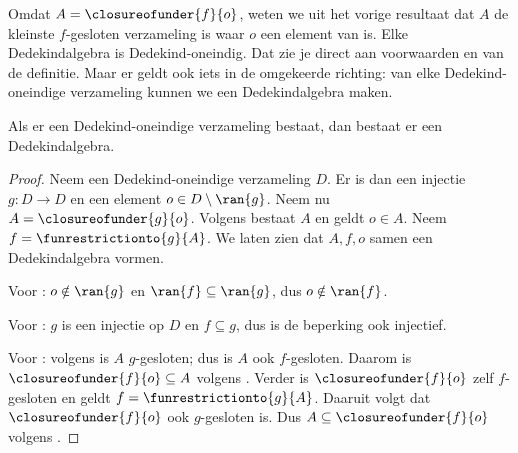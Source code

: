 \documentclass[../../../include/open-logic-section]{subfiles}
\begin{document}
Omdat $A = \closureofunder{f}{o}$, weten we uit het vorige resultaat
dat $A$ de kleinste $f$-gesloten verzameling is waar $o$ een element
van is. Elke Dedekindalgebra is Dedekind-oneindig. Dat zie je direct aan
voorwaarden  en  van de
definitie. Maar er geldt ook iets in de omgekeerde richting: van elke
Dedekind-oneindige verzameling kunnen we een Dedekindalgebra maken.

\begin{thm}
Als er een Dedekind-oneindige verzameling bestaat, dan bestaat er een
Dedekindalgebra.
\end{thm}

\begin{proof}
Neem een Dedekind-oneindige verzameling $D$. Er is dan een injectie $g
\colon D \to D$ en een element $o \in D \setminus \ran{g}$. Neem nu
$A = \closureofunder{g}{o}$. Volgens  bestaat
$A$ en geldt $o \in A$. Neem $f = \funrestrictionto{g}{A}$. We laten
zien dat $A, f, o$ samen een Dedekindalgebra vormen.

Voor : $o \notin \ran{g}$ en $\ran{f} \subseteq
\ran{g}$, dus $o\notin \ran{f}$.

Voor : $g$ is een injectie op $D$ en $f
\subseteq g$, dus is de beperking ook injectief.

Voor : volgens  is $A$
$g$-gesloten; dus is $A$ ook $f$-gesloten. Daarom is
$\closureofunder{f}{o} \subseteq A$ volgens
. Verder is $\closureofunder{f}{o}$ zelf
$f$-gesloten en geldt $f = \funrestrictionto{g}{A}$. Daaruit volgt dat
$\closureofunder{f}{o}$ ook $g$-gesloten is. Dus
$A \subseteq \closureofunder{f}{o}$ volgens
.
\end{proof}
\end{document}
